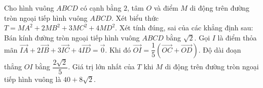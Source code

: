 \begin{ex}%
	Cho hình vuông $ABCD$ có cạnh bằng $2$, tâm $O$ và điểm $M$ di động trên đường tròn ngoại tiếp hình vuông $ABCD$. Xét biểu thức $T=MA^2+2MB^2+3MC^2+4MD^2$. Xét tính đúng, sai của các khẳng định sau:
	\choiceTF
	{\True Bán kính đường tròn ngoại tiếp hình vuông $ABCD$ bằng $\sqrt{2}$.}
	{\True Gọi $I$ là điểm thỏa mãn $\overrightarrow{IA}+2\overrightarrow{IB}+3\overrightarrow{IC}+4\overrightarrow{ID}=\overrightarrow{0}$. Khi đó $\overrightarrow{OI}=\dfrac{1}{5}(\overrightarrow{OC}+\overrightarrow{OD})$.}
	{Độ dài đoạn thẳng $OI$ bằng $\dfrac{2\sqrt{2}}{5}$.}
	{\True Giá trị lớn nhất của $T$ khi $M$ di động trên đường tròn ngoại tiếp hình vuông là $40+8\sqrt{2}$.}
\end{ex}

